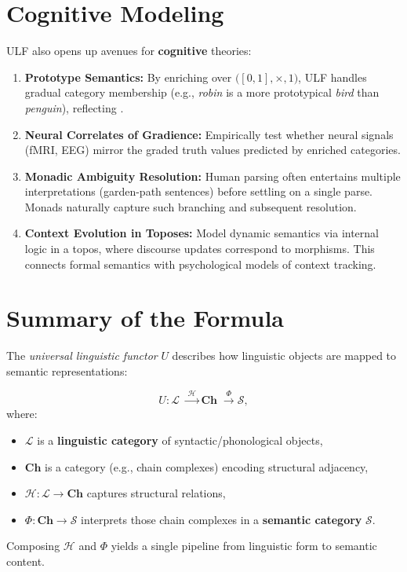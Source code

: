 \documentclass[12pt]{article}
\theoremstyle{plain}
\theoremstyle{definition}
\begin{document}
\section{Cognitive Modeling}\label{sec:cog}
ULF also opens up avenues for \textbf{cognitive} theories:

\begin{enumerate}
    \item \textbf{Prototype Semantics:}  
    By enriching over \(\bigl([0,1], \times, 1\bigr)\), ULF handles gradual category membership (e.g., \emph{robin} is a more prototypical \emph{bird} than \emph{penguin}), reflecting \cite{Rosch}.

    \item \textbf{Neural Correlates of Gradience:}  
    Empirically test whether neural signals (fMRI, EEG) mirror the graded truth values predicted by enriched categories.

    \item \textbf{Monadic Ambiguity Resolution:}  
    Human parsing often entertains multiple interpretations (garden-path sentences) before settling on a single parse. Monads naturally capture such branching and subsequent resolution.

    \item \textbf{Context Evolution in Toposes:}  
    Model dynamic semantics via internal logic in a topos, where discourse updates correspond to morphisms. This connects formal semantics with psychological models of context tracking.
\end{enumerate}

\section{Summary of the Formula}
\label{sec:summary_formula}
The \emph{universal linguistic functor} $U$ describes how linguistic objects are mapped to semantic representations:

\[
U : \mathcal{L} \;\xrightarrow{\;\mathcal{H}\;} \mathbf{Ch} \;\xrightarrow{\;\Phi\;} \mathcal{S},
\]
where:
\begin{itemize}
    \item $\mathcal{L}$ is a \textbf{linguistic category} of syntactic/phonological objects,
    \item $\mathbf{Ch}$ is a category (e.g., chain complexes) encoding structural adjacency,
    \item $\mathcal{H}\colon \mathcal{L} \to \mathbf{Ch}$ captures structural relations,
    \item $\Phi\colon \mathbf{Ch} \to \mathcal{S}$ interprets those chain complexes in a \textbf{semantic category} $\mathcal{S}$.
\end{itemize}
Composing $\mathcal{H}$ and $\Phi$ yields a single pipeline from linguistic form to semantic content.
\end{document}
